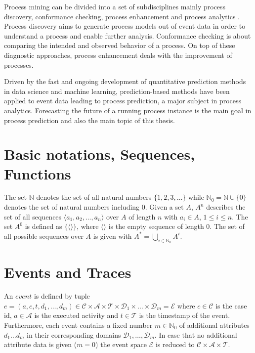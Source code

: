 Process mining can be divided into a set of subdisciplines mainly process discovery, conformance checking, process enhancement and process analytics \cite{DBLP:conf/caise/EckLLA15}.
Process discovery aims to generate process models out of event data in order to understand a process and enable further analysis.
Conformance checking is about comparing the intended and observed behavior of a process. 
On top of these diagnostic approaches, process enhancement deals with the improvement of processes.

Driven by the fast and ongoing development of quantitative prediction methods in data science and machine learning, prediction-based methods have been applied to event data leading to process prediction, a major subject in process analytics.
Forecasting the future of a running process instance is the main goal in process prediction and also the main topic of this thesis.



\section{Basic notations, Sequences, Functions}

The set $\mathbb{N}$ denotes the set of all natural numbers $\{1, 2, 3, \dots\}$ while $\mathbb{N}_0 = \mathbb{N} \cup \{0\}$ denotes the set of natural numbers including 0.
Given a set $A$, $A^n$ describes the set of all sequences $\langle a_1, a_2, \dots, a_n\rangle$ over $A$ of length $n$ with $a_i \in A$, $1 \leq i \leq n$.
The set $A^0$ is defined as $\{\langle \rangle\}$, where $\langle \rangle$ is the empty sequence of length $0$.
The set of all possible sequences over $A$ is given with $A^* = \bigcup\limits_{i\in \mathbb{N}_0} A^i$.



\section{Events and Traces}

\begin{definition}
An  $event$ is defined by tuple $e = (a,c,t,d_1,\dots, d_m) \in \mathcal{C} \times \mathcal{A}  \times \mathcal{T} \times \mathcal{D}_1 \times \dots \times \mathcal{D}_m =  \mathcal{E}$ where  $c \in \mathcal{C} $ is the case id, $a \in \mathcal{A}$ is the executed activity and $t \in \mathcal{T}$ is the timestamp of the event.
Furthermore, each event contains a fixed number $m \in \mathbb{N}_0$ of additional attributes $d_1 \dots d_m$ in their corresponding domains $\mathcal{D}_1, \dots , \mathcal{D}_m$.
In case that no additional attribute data is given ($m = 0$) the event space $\mathcal{E}$ is reduced to $\mathcal{C} \times \mathcal{A}  \times \mathcal{T}$.
\end{definition}

